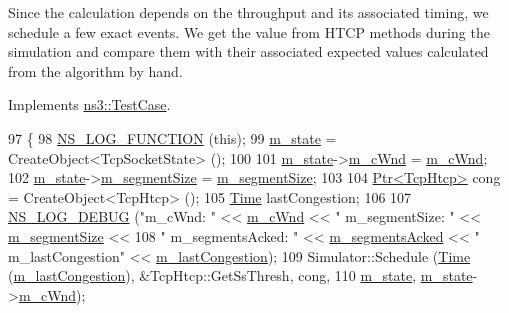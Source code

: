 Since the calculation depends on the throughput and its associated timing, we schedule a few exact events. We get the value from H\+T\+CP methods during the simulation and compare them with their associated expected values calculated from the algorithm by hand. 



Implements \hyperlink{classns3_1_1TestCase_a8ff74680cf017ed42011e4be51917a24}{ns3\+::\+Test\+Case}.


\begin{DoxyCode}
97 \{
98   \hyperlink{log-macros-disabled_8h_a90b90d5bad1f39cb1b64923ea94c0761}{NS\_LOG\_FUNCTION} (\textcolor{keyword}{this});
99   \hyperlink{classTcpHtcpIncrementTest_acdf9e9924087e9410acd0f0060dd3131}{m\_state} = CreateObject<TcpSocketState> ();
100 
101   \hyperlink{classTcpHtcpIncrementTest_acdf9e9924087e9410acd0f0060dd3131}{m\_state}->\hyperlink{classns3_1_1TcpSocketState_a7cd3d2156a483c1db436097477a0fd7f}{m\_cWnd} = \hyperlink{classTcpHtcpIncrementTest_a76dde1fff1851661480d009b05064d5d}{m\_cWnd};
102   \hyperlink{classTcpHtcpIncrementTest_acdf9e9924087e9410acd0f0060dd3131}{m\_state}->\hyperlink{classns3_1_1TcpSocketState_a079872f7b0099ef5f3cab4ff47bd2edd}{m\_segmentSize} = \hyperlink{classTcpHtcpIncrementTest_ad8ec2faf12b693a0cbddd454af54aa70}{m\_segmentSize};
103 
104   \hyperlink{classns3_1_1Ptr}{Ptr<TcpHtcp>} cong = CreateObject<TcpHtcp> ();
105   \hyperlink{classns3_1_1Time}{Time} lastCongestion;
106 
107   \hyperlink{group__logging_ga413f1886406d49f59a6a0a89b77b4d0a}{NS\_LOG\_DEBUG} (\textcolor{stringliteral}{"m\_cWnd: "} << \hyperlink{classTcpHtcpIncrementTest_a76dde1fff1851661480d009b05064d5d}{m\_cWnd} << \textcolor{stringliteral}{" m\_segmentSize: "} << 
      \hyperlink{classTcpHtcpIncrementTest_ad8ec2faf12b693a0cbddd454af54aa70}{m\_segmentSize} <<
108                 \textcolor{stringliteral}{" m\_segmentsAcked: "} << \hyperlink{classTcpHtcpIncrementTest_a6f33c48257c870135c934ae9f1772432}{m\_segmentsAcked} << \textcolor{stringliteral}{" m\_lastCongestion"} << 
      \hyperlink{classTcpHtcpIncrementTest_a497d4d2a1569ce8d34bbd358a71d1148}{m\_lastCongestion});
109   Simulator::Schedule (\hyperlink{classns3_1_1Time}{Time} (\hyperlink{classTcpHtcpIncrementTest_a497d4d2a1569ce8d34bbd358a71d1148}{m\_lastCongestion}), &TcpHtcp::GetSsThresh, cong,
110                        \hyperlink{classTcpHtcpIncrementTest_acdf9e9924087e9410acd0f0060dd3131}{m\_state}, \hyperlink{classTcpHtcpIncrementTest_acdf9e9924087e9410acd0f0060dd3131}{m\_state}->\hyperlink{classns3_1_1TcpSocketState_a7cd3d2156a483c1db436097477a0fd7f}{m\_cWnd});

\end{DoxyCode}
